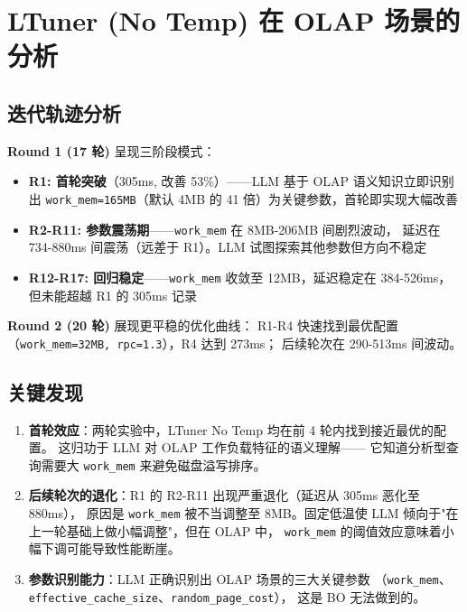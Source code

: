 
\section{LTuner (No Temp) 在 OLAP 场景的分析}

\subsection{迭代轨迹分析}

\textbf{Round 1 (17 轮)} 呈现三阶段模式：

\begin{itemize}
  \item \textbf{R1: 首轮突破}（305ms, 改善 53\%）——LLM 基于 OLAP 语义知识立即识别出
        \texttt{work\_mem=165MB}（默认 4MB 的 41 倍）为关键参数，首轮即实现大幅改善
  \item \textbf{R2-R11: 参数震荡期}——\texttt{work\_mem} 在 8MB-206MB 间剧烈波动，
        延迟在 734-880ms 间震荡（远差于 R1）。LLM 试图探索其他参数但方向不稳定
  \item \textbf{R12-R17: 回归稳定}——\texttt{work\_mem} 收敛至 12MB，延迟稳定在 384-526ms，
        但未能超越 R1 的 305ms 记录
\end{itemize}

\textbf{Round 2 (20 轮)} 展现更平稳的优化曲线：
R1-R4 快速找到最优配置（\texttt{work\_mem=32MB, rpc=1.3}），R4 达到 273ms；
后续轮次在 290-513ms 间波动。

\subsection{关键发现}

\begin{enumerate}
  \item \textbf{首轮效应}：两轮实验中，LTuner No Temp 均在前 4 轮内找到接近最优的配置。
        这归功于 LLM 对 OLAP 工作负载特征的语义理解——
        它知道分析型查询需要大 \texttt{work\_mem} 来避免磁盘溢写排序。
  \item \textbf{后续轮次的退化}：R1 的 R2-R11 出现严重退化（延迟从 305ms 恶化至 880ms），
        原因是 \texttt{work\_mem} 被不当调整至 8MB。固定低温使 LLM
        倾向于"在上一轮基础上做小幅调整"，但在 OLAP 中，
        \texttt{work\_mem} 的阈值效应意味着小幅下调可能导致性能断崖。
  \item \textbf{参数识别能力}：LLM 正确识别出 OLAP 场景的三大关键参数
       （\texttt{work\_mem}、\texttt{effective\_cache\_size}、\texttt{random\_page\_cost}），
        这是 BO 无法做到的。
\end{enumerate}


